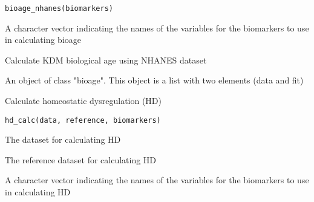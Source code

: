\documentclass[a4paper]{book}
\begin{document}
%
\begin{Usage}
\begin{verbatim}
bioage_nhanes(biomarkers)
\end{verbatim}
\end{Usage}
%
\begin{Arguments}
\begin{ldescription}
\item[\code{biomarkers}] A character vector indicating the names of the variables for the biomarkers to use in calculating bioage
\end{ldescription}
\end{Arguments}
%
\begin{Details}\relax
Calculate KDM biological age using NHANES dataset
\end{Details}
%
\begin{Value}
An object of class "bioage". This object is a list with two elements (data and fit)
\end{Value}
%
\begin{Examples}
\end{Examples}
%
\begin{Description}\relax
Calculate homeostatic dysregulation (HD)
\end{Description}
%
\begin{Usage}
\begin{verbatim}
hd_calc(data, reference, biomarkers)
\end{verbatim}
\end{Usage}
%
\begin{Arguments}
\begin{ldescription}
\item[\code{data}] The dataset for calculating HD

\item[\code{reference}] The reference dataset for calculating HD

\item[\code{biomarkers}] A character vector indicating the names of the variables for the biomarkers to use in calculating HD
\end{ldescription}
\end{Arguments}
\end{document}
